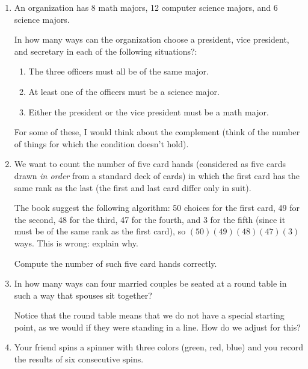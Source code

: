 \documentclass[12pt]{article}
\begin{document}
\begin{enumerate}
\newpage

\item  An organization has 8 math majors, 12 computer science majors, and 6 science majors.

In how many ways can the organization choose a president, vice president, and secretary in each of the following situations?:

\begin{enumerate}
\item   The three officers must all be of the same major.

\item   At least one of the officers must be a science major.

\item  Either the president or the vice president must be a math major.

\end{enumerate}

For some of these, I would think about the complement (think of the number of things for which the condition doesn't hold).

\newpage

\item  We want to count the number of five card hands (considered as five cards drawn {\em in order\/} from a standard deck of cards) in which the first card has the same rank as the last (the first and last card differ only in suit).

The book suggest the following algorithm:  50 choices for the first card, 49 for the second, 48 for the third, 47 for the fourth,
and 3 for the fifth (since it must be of the same rank as the first card), so $(50)(49)(48)(47)(3)$ ways.  This is wrong:
explain why.

Compute the number of such five card hands correctly.

\newpage

\item  In how many ways can four married couples be seated at a round table in such a way that spouses sit together?

Notice that the round table means that we do not have a special starting point, as we would if they were standing in a line.  How do we adjust for this?

\newpage

\item  Your friend spins a spinner with three colors (green, red, blue) and you record the results of six consecutive spins.


\end{enumerate}
\end{document}
